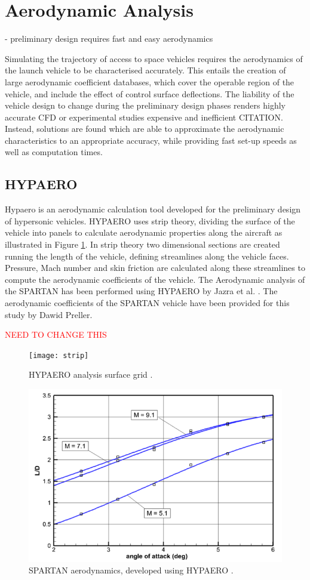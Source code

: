 \section{Aerodynamic Analysis}
- preliminary design requires fast and easy aerodynamics 

Simulating the trajectory of access to space vehicles requires the aerodynamics of the launch vehicle to be characterised accurately. This entails the creation of large aerodynamic coefficient databases, which cover the operable region of the vehicle, and include the effect of control surface deflections. The liability of the vehicle design to change during the preliminary design phases renders highly accurate CFD or experimental studies expensive and inefficient CITATION. Instead, solutions are found which are able to approximate the aerodynamic characteristics to an appropriate accuracy, while providing fast set-up speeds as well as computation times. 

\subsection{HYPAERO}

Hypaero is an aerodynamic calculation tool developed for the preliminary design of hypersonic vehicles. 
HYPAERO uses strip theory, dividing the surface of the vehicle into panels to calculate aerodynamic properties along the aircraft as illustrated in Figure \ref{fig:strip}. In strip theory two dimensional sections are created running the length of the vehicle, defining streamlines along the vehicle faces. Pressure, Mach number and skin friction are calculated along these streamlines to compute the aerodynamic coefficients of the vehicle. The Aerodynamic analysis of the SPARTAN has been performed using HYPAERO by Jazra et al. \cite{Jazra2013}. The aerodynamic coefficients of the SPARTAN vehicle have been provided for this study by Dawid Preller.

\textcolor{red}{NEED TO CHANGE THIS}

\begin{figure}[ht]
	\centering
	\texttt{[image: strip]}
	\caption{HYPAERO analysis surface grid \cite{Jazra2013}.}
	\label{fig:strip}
\end{figure}

\begin{figure}
\centering
\includegraphics[width=0.7\linewidth]{figures/2_literature-review/HYPAERO-aero}
\caption{SPARTAN aerodynamics, developed using HYPAERO \cite{Preller2017}.}
\label{fig:HYPAERO-aero}
\end{figure}


